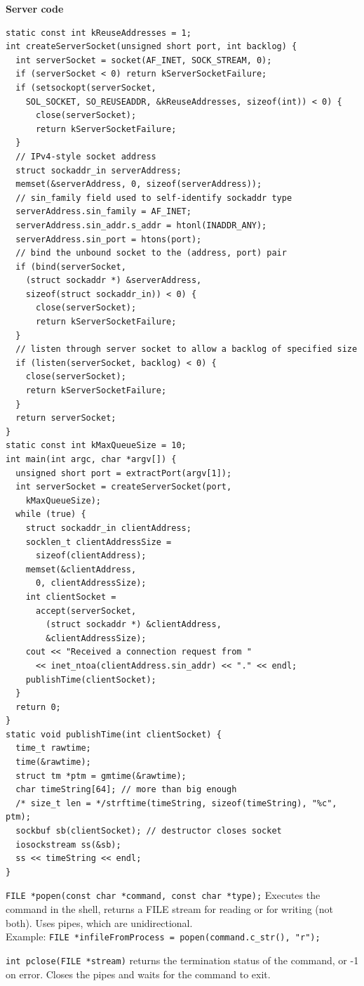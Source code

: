 \documentclass{article}
\begin{document}
\begin{multicols}{2}
  {\bf Server code}{\scriptsize
  \begin{verbatim}
static const int kReuseAddresses = 1;
int createServerSocket(unsigned short port, int backlog) {
  int serverSocket = socket(AF_INET, SOCK_STREAM, 0);
  if (serverSocket < 0) return kServerSocketFailure;
  if (setsockopt(serverSocket,
    SOL_SOCKET, SO_REUSEADDR, &kReuseAddresses, sizeof(int)) < 0) {
      close(serverSocket);
      return kServerSocketFailure;
  }
  // IPv4-style socket address
  struct sockaddr_in serverAddress;
  memset(&serverAddress, 0, sizeof(serverAddress));
  // sin_family field used to self-identify sockaddr type
  serverAddress.sin_family = AF_INET;
  serverAddress.sin_addr.s_addr = htonl(INADDR_ANY);
  serverAddress.sin_port = htons(port);
  // bind the unbound socket to the (address, port) pair
  if (bind(serverSocket,
    (struct sockaddr *) &serverAddress,
    sizeof(struct sockaddr_in)) < 0) {
      close(serverSocket);
      return kServerSocketFailure;
  }
  // listen through server socket to allow a backlog of specified size
  if (listen(serverSocket, backlog) < 0) {
    close(serverSocket);
    return kServerSocketFailure;
  }
  return serverSocket;
}
static const int kMaxQueueSize = 10;
int main(int argc, char *argv[]) {
  unsigned short port = extractPort(argv[1]);
  int serverSocket = createServerSocket(port,
    kMaxQueueSize);
  while (true) {
    struct sockaddr_in clientAddress;
    socklen_t clientAddressSize =
      sizeof(clientAddress);
    memset(&clientAddress,
      0, clientAddressSize);
    int clientSocket =
      accept(serverSocket,
        (struct sockaddr *) &clientAddress,
        &clientAddressSize);
    cout << "Received a connection request from "
      << inet_ntoa(clientAddress.sin_addr) << "." << endl;
    publishTime(clientSocket);
  }
  return 0;
}
static void publishTime(int clientSocket) {
  time_t rawtime;
  time(&rawtime);
  struct tm *ptm = gmtime(&rawtime);
  char timeString[64]; // more than big enough
  /* size_t len = */strftime(timeString, sizeof(timeString), "%c", ptm);
  sockbuf sb(clientSocket); // destructor closes socket
  iosockstream ss(&sb);
  ss << timeString << endl;
} \end{verbatim}}
  {\tt FILE *popen(const char *command, const char *type);} Executes the command
  in the shell, returns a FILE stream for reading or for writing (not both).
  Uses pipes, which are unidirectional.\\
  Example: {\tt FILE *infileFromProcess = popen(command.c\_str(), "r");}

  {\tt int pclose(FILE *stream)} returns the termination status of the command,
  or -1 on error. Closes the pipes and waits for the command to exit.


\end{multicols}
\end{document}
